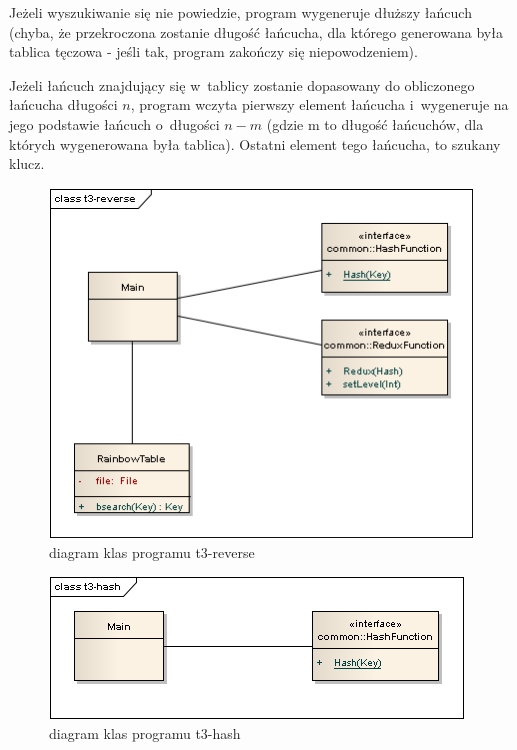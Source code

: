 \documentclass[a4paper]{scrartcl}
\begin{document}
Jeżeli wyszukiwanie się nie powiedzie, program wygeneruje dłuższy łańcuch (chyba, że przekroczona zostanie długość łańcucha, dla którego generowana była tablica tęczowa - jeśli tak, program zakończy się niepowodzeniem).

Jeżeli łańcuch znajdujący się w~tablicy zostanie dopasowany do obliczonego łańcucha długości $n$, program wczyta pierwszy element łańcucha i~wygeneruje na jego podstawie łańcuch o~długości $n-m$ (gdzie m to długość łańcuchów, dla których wygenerowana była tablica). Ostatni element tego łańcucha, to szukany klucz.
\begin{figure}
\begin{center}
\includegraphics{t3-reverse.png}
\end{center}
\caption{diagram klas programu t3-reverse}
\end{figure}

\begin{figure}
\begin{center}
\includegraphics{t3-hash.png}
\end{center}
\caption{diagram klas programu t3-hash}
\end{figure}
\end{document}
